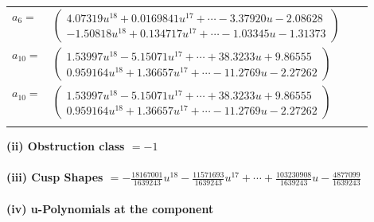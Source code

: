 \documentclass[1p]{elsarticle_modified}
\theoremstyle{definition}
\begin{document}
\begin{tabular}{m{7pt} m{180pt} m{7pt} m{180pt} }
\flushright $a_{6}=$&$\begin{pmatrix}4.07319 u^{18}+0.0169841 u^{17}+\cdots-3.37920 u-2.08628\\-1.50818 u^{18}+0.134717 u^{17}+\cdots-1.03345 u-1.31373\end{pmatrix}$ \\
\flushright $a_{10}=$&$\begin{pmatrix}1.53997 u^{18}-5.15071 u^{17}+\cdots+38.3233 u+9.86555\\0.959164 u^{18}+1.36657 u^{17}+\cdots-11.2769 u-2.27262\end{pmatrix}$\\ \flushright $a_{10}=$&$\begin{pmatrix}1.53997 u^{18}-5.15071 u^{17}+\cdots+38.3233 u+9.86555\\0.959164 u^{18}+1.36657 u^{17}+\cdots-11.2769 u-2.27262\end{pmatrix}$\\&\end{tabular}
\flushleft \textbf{(ii) Obstruction class $= -1$}\\~\\
\flushleft \textbf{(iii) Cusp Shapes $= -\frac{18167001}{1639243} u^{18}-\frac{11571693}{1639243} u^{17}+\cdots+\frac{103230908}{1639243} u-\frac{4877099}{1639243}$}\\~\\
\newpage\renewcommand{\arraystretch}{1}
\flushleft \textbf{(iv) u-Polynomials at the component}\newline \\
\end{document}
